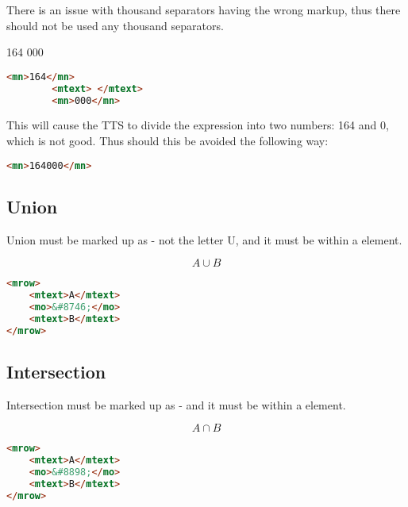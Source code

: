 \documentclass[english,a4paper,11pt]{article}
\begin{document}
There is an issue with thousand separators having the wrong markup, thus there should not be used any thousand separators.

\begin{eksempler}
	\textsc{164 000}
	\begin{lstlisting}[language=HTML, caption={\textbf{Invalid markup}}]
		<mn>164</mn>
		<mtext> </mtext>
		<mn>000</mn> 
	\end{lstlisting}
	
	This will cause the TTS to divide the expression into two numbers: 164 and 0, which is not good. Thus should this be avoided the following way:
	\begin{lstlisting}[language=HTML, caption={Valid markup}]
		<mn>164000</mn>
	\end{lstlisting}
\end{eksempler}

\subsection{Union}

Union must be marked up as  - not the letter U, and it must be within a  element. 

\begin{eksempler}
\begin{equation}
	A \cup B
\end{equation}
\begin{lstlisting}[language=HTML]
<mrow>
	<mtext>A</mtext>
	<mo>&#8746;</mo>
	<mtext>B</mtext>
</mrow>
\end{lstlisting}
\end{eksempler}

\subsection{Intersection}

Intersection must be marked up as  - and it must be within a  element. 

\begin{eksempler}
\begin{equation}
	A \cap B
\end{equation}
\begin{lstlisting}[language=HTML]
<mrow>
	<mtext>A</mtext>
	<mo>&#8898;</mo>
	<mtext>B</mtext>
</mrow>
\end{lstlisting}
\end{eksempler}
\end{document}
